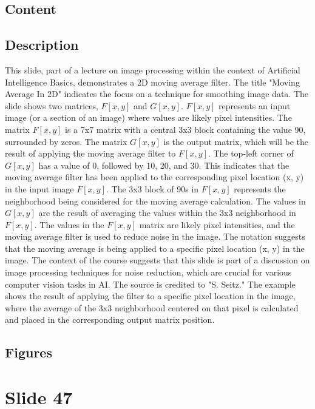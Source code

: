 \documentclass{article}%
\begin{document}
\subsection{Content}%
%
\subsection{Description}%
This slide, part of a lecture on image processing within the context of Artificial Intelligence Basics, demonstrates a 2D moving average filter.  The title "Moving Average In 2D" indicates the focus on a technique for smoothing image data.  The slide shows two matrices, $F[x, y]$ and $G[x, y]$.  $F[x, y]$ represents an input image (or a section of an image) where values are likely pixel intensities.  The matrix $F[x, y]$ is a 7x7 matrix with a central 3x3 block containing the value 90, surrounded by zeros.  The matrix $G[x, y]$ is the output matrix, which will be the result of applying the moving average filter to $F[x, y]$.  The top-left corner of $G[x, y]$ has a value of 0, followed by 10, 20, and 30. This indicates that the moving average filter has been applied to the corresponding pixel location (x, y) in the input image $F[x, y]$. The 3x3 block of 90s in $F[x, y]$ represents the neighborhood being considered for the moving average calculation. The values in $G[x, y]$ are the result of averaging the values within the 3x3 neighborhood in $F[x, y]$. The values in the $F[x, y]$ matrix are likely pixel intensities, and the moving average filter is used to reduce noise in the image. The notation suggests that the moving average is being applied to a specific pixel location (x, y) in the image. The context of the course suggests that this slide is part of a discussion on image processing techniques for noise reduction, which are crucial for various computer vision tasks in AI. The source is credited to "S. Seitz."  The example shows the result of applying the filter to a specific pixel location in the image, where the average of the 3x3 neighborhood centered on that pixel is calculated and placed in the corresponding output matrix position.%
\subsection{Figures}%
\begin{figure}[H]%
\centering%
\end{figure}

%
\newpage%
\section{Slide 47}%
\label{sec:Slide47}%
\end{document}
